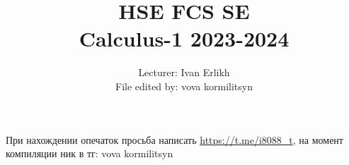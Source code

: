 \documentclass{report}
\title{\textbf{HSE FCS SE}\\\textbf{Calculus-1 2023-2024}}
\author{Lecturer: Ivan Erlikh\\File edited by: vova kormilitsyn}
\date{
    \begin{flushright}
        ver. 1.3.1
    \end{flushright}
}
\begin{document}
\maketitle

\tableofcontents













При нахождении опечаток просьба написать \url{https://t.me/i8088_t}, на момент компиляции ник в тг: vova kormilitsyn

\end{document}
